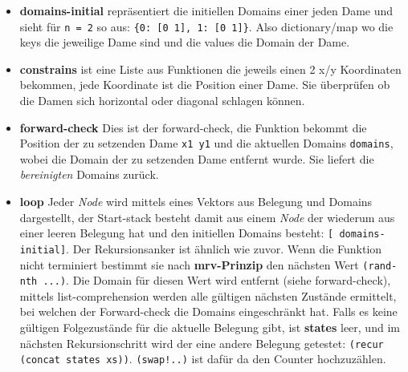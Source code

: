 \documentclass[a4paper,10pt]{article}
\begin{document}
\begin{itemize}
  \item \textbf{domains-initial} repräsentiert die initiellen Domains einer jeden Dame und sieht für \texttt{n = 2} so aus: \texttt{\{0: [0 1], 1: [0 1]\}}. Also dictionary/map wo die keys die jeweilige Dame sind und die values die Domain der Dame.
    \item \textbf{constrains} ist eine Liste aus Funktionen die jeweils einen 2 x/y Koordinaten bekommen, jede Koordinate ist die Position einer Dame. Sie überprüfen ob die Damen sich horizontal oder diagonal schlagen können.
    \item \textbf{forward-check} Dies ist der forward-check, die Funktion bekommt die Position der zu setzenden Dame \texttt{x1 y1} und die aktuellen Domains \texttt{domains}, wobei die Domain der zu setzenden Dame entfernt wurde. Sie liefert die \textit{bereinigten} Domains zurück.
    \item \textbf{loop} Jeder \textit{Node} wird mittels eines Vektors aus Belegung und Domains dargestellt, der Start-stack besteht damit aus einem \textit{Node} der wiederum aus einer leeren Belegung hat und den initiellen Domains besteht: \texttt{[{} domains-initial]}. Der Rekursionsanker ist ähnlich wie zuvor. Wenn die Funktion nicht terminiert bestimmt sie nach \textbf{mrv-Prinzip} den nächsten Wert \texttt{(rand-nth ...)}. Die Domain für diesen Wert wird entfernt (siehe forward-check), mittels list-comprehension werden alle gültigen nächsten Zustände ermittelt, bei welchen der Forward-check die Domains eingeschränkt hat. Falls es keine gültigen Folgezustände für die aktuelle Belegung gibt, ist \textbf{states} leer, und im nächsten Rekursionschritt wird der eine andere Belegung getestet: \texttt{(recur (concat states xs))}. \texttt{(swap!..)} ist dafür da den Counter hochzuzählen.
\end{itemize}
\newpage
\end{document}
